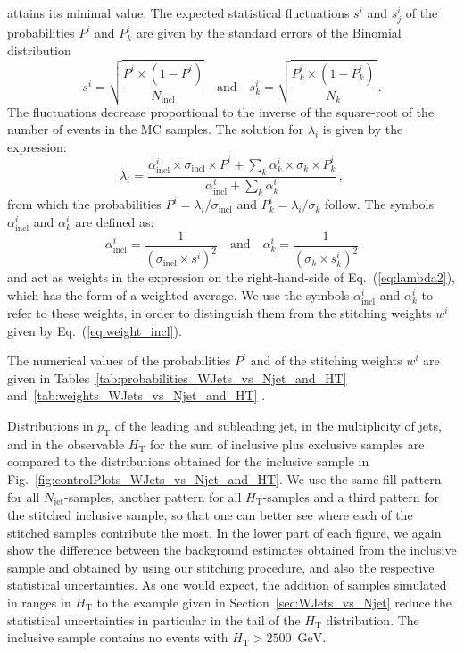 \documentclass[twocolumn,epjc3]{svjour3}
\newcommand{\pT}{\ensuremath{p_{\textrm{T}}}\xspace}
\newcommand{\HT}{\ensuremath{H_{\mathrm{T}}}\xspace}
\newcommand{\GeV}{\ensuremath{\textrm{GeV}}\xspace}
\newcommand{\incl}{\ensuremath{\textrm{incl}}\xspace}
\newcommand{\jet}{\ensuremath{\textrm{jet}}\xspace}
\begin{document}
attains its minimal value.
The expected statistical fluctuations $s^{i}$ and $s_{j}^{i}$ of the probabilities $P^{i}$ and $P_{k}^{i}$
are given by the standard errors of the Binomial distribution~\cite{Cowan:1998ji}
\begin{equation*}
s^{i} = \sqrt{\frac{P^{i} \times (1 - P^{i})}{N_{\incl}}} \quad \mbox{and} \quad s_{k}^{i} = \sqrt{\frac{P_{k}^{i} \times (1 - P_{k}^{i})}{N_{k}}} \, .
\end{equation*}
The fluctuations decrease proportional to the inverse of the square-root of the number of events in the MC samples.
The solution for $\lambda_{i}$ is given by the expression:
\begin{equation}
\lambda_{i} = \frac{\alpha_{\incl}^{i} \times \sigma_{\incl} \times P^{i} + \sum_{k} \alpha_{k}^{i} \times \sigma_{k} \times P_{k}^{i}}{\alpha_{\incl}^{i} + \sum_{k} \alpha_{k}^{i}} \, ,
\label{eq:lambda2}
\end{equation}
from which the probabilities $P^{i} = \lambda_{i}/\sigma_{\incl}$ and $P_{k}^{i} = \lambda_{i}/\sigma_{k}$ follow.
The symbols $\alpha_{\incl}^{i}$ and $\alpha_{k}^{i}$ are defined as:
\begin{equation*}
\alpha_{\incl}^{i} = \frac{1}{\left( \sigma_{\incl} \times s^{i} \right)^{2}} \quad \mbox{and} \quad \alpha_{k}^{i} = \frac{1}{\left( \sigma_{k} \times s_{k}^{i} \right)^{2}}
\end{equation*}
and act as weights in the expression on the right-hand-side of Eq.~(\ref{eq:lambda2}),
which has the form of a weighted average.
We use the symbols $\alpha_{\incl}^{i}$ and $\alpha_{k}^{i}$ to refer to these weights,
in order to distinguish them from the stitching weights $w^{i}$ given by Eq.~(\ref{eq:weight_incl}).

The numerical values of the probabilities $P^{i}$ and of the stitching weights $w^{i}$ are given in Tables~\ref{tab:probabilities_WJets_vs_Njet_and_HT}
and~\ref{tab:weights_WJets_vs_Njet_and_HT}
.

Distributions in $\pT$ of the leading and subleading jet,
in the multiplicity of jets, and in the observable $\HT$ 
for the sum of inclusive plus exclusive samples are compared to the distributions obtained for the inclusive sample in Fig.~\ref{fig:controlPlots_WJets_vs_Njet_and_HT}.
We use the same fill pattern for all $N_{\jet}$-samples, another pattern for all $\HT$-samples and a third pattern for the stitched inclusive sample,
so that one can better see where each of the stitched samples contribute the most.
In the lower part of each figure, we again show the difference between the background estimates obtained from the inclusive sample and obtained by using our stitching procedure,
and also the respective statistical uncertainties.
As one would expect, the addition of samples simulated in ranges in $\HT$ to the example given in Section~\ref{sec:WJets_vs_Njet}
reduce the statistical uncertainties in particular in the tail of the $\HT$ distribution.
The inclusive sample contains no events with $\HT > 2500$~\GeV.
\end{document}
